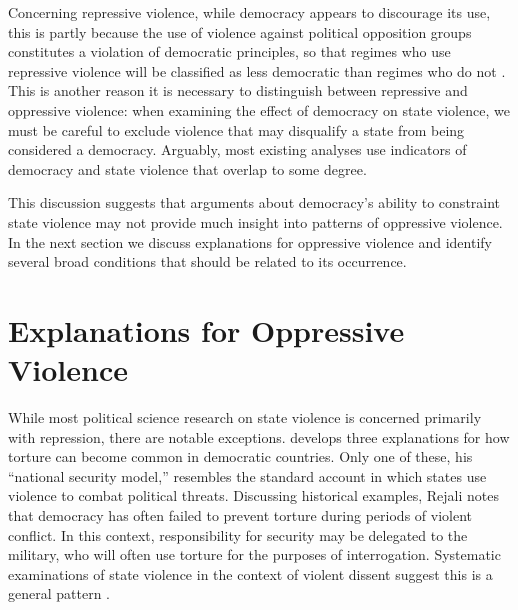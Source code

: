 \documentclass[11pt]{article}
\begin{document}
Concerning repressive violence, while democracy appears to discourage its use, this is partly because the use of violence against political opposition groups constitutes a violation of democratic principles, so that regimes who use repressive violence will be classified as less democratic than regimes who do not \citep{Hill2016}. This is another reason it is necessary to distinguish between repressive and oppressive violence: when examining the effect of democracy on state violence, we must be careful to exclude violence that may disqualify a state from being considered a democracy. Arguably, most existing analyses use indicators of democracy and state violence that overlap to some degree. 

This discussion suggests that arguments about democracy's ability to constraint state violence may not provide much insight into patterns of oppressive violence. In the next section we discuss explanations for oppressive violence and identify several broad conditions that should be related to its occurrence. 




\section*{Explanations for Oppressive Violence}

While most political science research on state violence is concerned primarily with repression, there are notable exceptions. \citet{Rejali2007} develops three explanations for how torture can become common in democratic countries. Only one of these, his ``national security model,'' resembles the standard account in which states use violence to combat political threats. Discussing historical examples, Rejali notes that democracy has often failed to prevent torture during periods of violent conflict. In this context, responsibility for security may be delegated to the military, who will often use torture for the purposes of interrogation. Systematic examinations of state violence in the context of violent dissent suggest this is a general pattern \citep{Davenport2007,Davenport2007AR,DavenportMooreArmstrong2007,ConradMoore2010}. 
\end{document}
